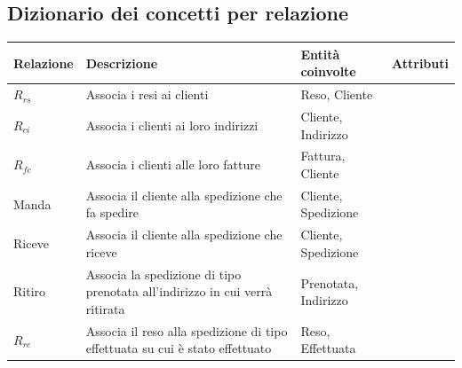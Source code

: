 \documentclass[a4paper,12pt]{article}
\begin{document}
\subsection{Dizionario dei concetti per relazione}
\begin{table}[H]
	\centering
	\begin{tabularx}{\dimexpr{}\arrayrulewidth}{|*{4}{Y|}} %
		\hline
		\textbf{Relazione} & \textbf{Descrizione} & \textbf{Entità coinvolte} & \textbf{Attributi} \\ \hline
		$R_{rs}$ & Associa i resi ai clienti & Reso, Cliente & \\ 
		\hline
		$R_{ci}$ & Associa i clienti ai loro indirizzi & Cliente, Indirizzo & \\ 
    \hline
    $R_{fc}$ & Associa i clienti alle loro fatture & Fattura, Cliente & \\
    \hline
    Manda & Associa il cliente alla spedizione che fa spedire & Cliente, Spedizione & \\
    \hline 
    Riceve & Associa il cliente alla spedizione che riceve & Cliente, Spedizione & \\
    \hline
    Ritiro & Associa la spedizione di tipo prenotata all'indirizzo in cui verrà ritirata & Prenotata, Indirizzo & \\
    \hline 
    $R_{re}$ & Associa il reso alla spedizione di tipo effettuata su cui è stato effettuato & Reso, Effettuata & \\ \hline 
	\end{tabularx}
\end{table}
\end{document}
